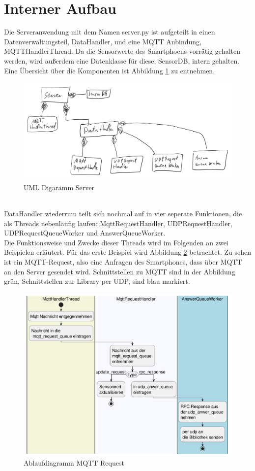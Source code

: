 \documentclass[11pt,a4paper]{report}
\begin{document}
\section{Interner Aufbau}
Die Serveranwendung mit dem Namen server.py ist aufgeteilt in einen Datenverwaltungsteil, DataHandler, und eine MQTT Anbindung, MQTTHandlerThread.
Da die Sensorwerte des Smartphoens vorrätig gehalten werden, wird außerdem eine Datenklasse für diese, SensorDB, intern gehalten.
Eine Übersicht über die Komponenten ist Abbildung \ref{fig:serverUml} zu entnehmen.
\begin{figure}[htbp]
  \centering
  \includegraphics[width=.8\textwidth]{images/ServerUml.png}
  \caption{UML Digaramm Server}
  \label{fig:serverUml}
\end{figure}
\\
DataHandler wiederrum teilt sich nochmal auf in vier seperate Funktionen, die als Threads nebenläufig laufen: MqttRequestHandler, UDPRequestHandler, UDPRequestQueueWorker und AnswerQueueWorker.
\\
Die Funktionsweise und Zwecke dieser Threads wird im Folgenden an zwei Beispielen erläutert.
Für das erste Beispiel wird Abbildung \ref{fig:serverMqttReqPath} betrachtet.
Zu sehen ist ein MQTT-Request, also eine Anfragen des Smartphones, dass über MQTT an den Server gesendet wird.
Schnittstellen zu MQTT sind in der Abbildung grün, Schnittstellen zur Library per UDP, sind blau markiert.
\begin{figure}[htbp]
  \centering
  \includegraphics[width=.8\textwidth]{images/MqttRequestServerPath}
  \caption{Ablaufdiagramm MQTT Request}
  \label{fig:serverMqttReqPath}
\end{figure}
\end{document}
